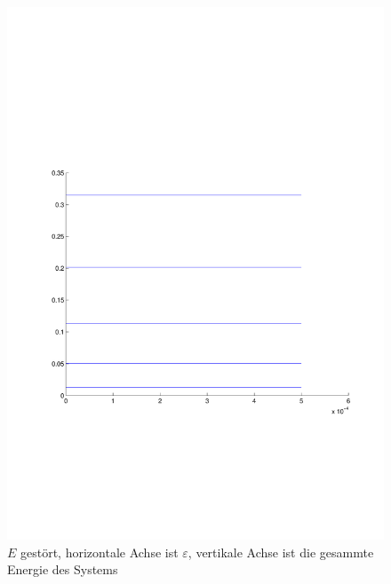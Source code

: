\begin{refsection}
\begin{figure}
 \centering
 \includegraphics[width=12cm,clip=true,trim=2cm 7cm 1cm 8cm]{efeld/Energie_gestoert.pdf}
 \caption{$E$ gest\"ort, horizontale Achse ist $\varepsilon$, vertikale Achse ist die gesammte Energie des Systems}
 \label{abb:efeld_E_gestoert}
\end{figure}





\printbibliography[heading=subbibliography]
\end{refsection}
